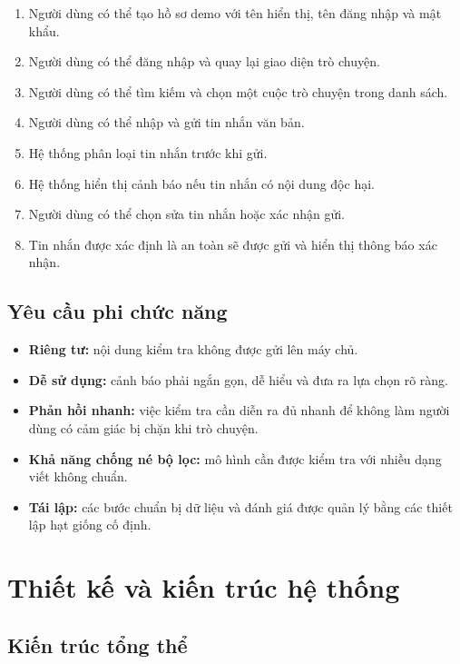 \documentclass[12pt,a4paper]{article}
\begin{document}
\begin{enumerate}
    \item Người dùng có thể tạo hồ sơ demo với tên hiển thị, tên đăng nhập và mật khẩu.
    \item Người dùng có thể đăng nhập và quay lại giao diện trò chuyện.
    \item Người dùng có thể tìm kiếm và chọn một cuộc trò chuyện trong danh sách.
    \item Người dùng có thể nhập và gửi tin nhắn văn bản.
    \item Hệ thống phân loại tin nhắn trước khi gửi.
    \item Hệ thống hiển thị cảnh báo nếu tin nhắn có nội dung độc hại.
    \item Người dùng có thể chọn sửa tin nhắn hoặc xác nhận gửi.
    \item Tin nhắn được xác định là an toàn sẽ được gửi và hiển thị thông báo xác nhận.
\end{enumerate}

\subsection{Yêu cầu phi chức năng}

\begin{itemize}
    \item \textbf{Riêng tư:} nội dung kiểm tra không được gửi lên máy chủ.
    \item \textbf{Dễ sử dụng:} cảnh báo phải ngắn gọn, dễ hiểu và đưa ra lựa chọn rõ ràng.
    \item \textbf{Phản hồi nhanh:} việc kiểm tra cần diễn ra đủ nhanh để không làm người dùng có cảm giác bị chặn khi trò chuyện.
    \item \textbf{Khả năng chống né bộ lọc:} mô hình cần được kiểm tra với nhiều dạng viết không chuẩn.
    \item \textbf{Tái lập:} các bước chuẩn bị dữ liệu và đánh giá được quản lý bằng các thiết lập hạt giống cố định.
\end{itemize}

\section{Thiết kế và kiến trúc hệ thống}

\subsection{Kiến trúc tổng thể}
\end{document}
